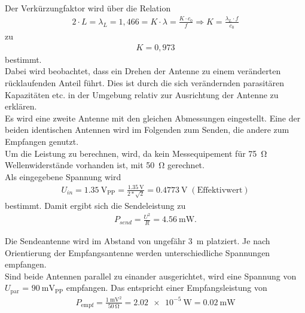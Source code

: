 \documentclass[a4paper,twoside,final]{article}
\begin{document}
Der Verkürzungfaktor wird über die Relation
\begin{align}
2\cdot L = \lambda_{L} = 1,466 = K \cdot \lambda = \frac{K\cdot c_0}{f} \Rightarrow K = \frac{\lambda_L \cdot f}{c_0}
\end{align}
zu
\begin{align}
K = 0,973
\end{align}
bestimmt.\\

Dabei wird beobachtet, dass ein Drehen der Antenne zu einem veränderten rücklaufenden Anteil führt. Dies ist durch die sich verändernden parasitären Kapazitäten etc. in der Umgebung relativ zur Ausrichtung der Antenne zu erklären.  \\
Es wird eine zweite Antenne mit den gleichen Abmessungen eingestellt. Eine der beiden identischen Antennen wird im Folgenden zum Senden, die andere zum Empfangen genutzt. \\
Um die Leistung zu berechnen, wird, da kein Messequipement für \SI{75}{\ohm} Wellenwiderstände vorhanden ist, mit \SI{50}{\ohm} gerechnet. \\
Als eingegebene Spannung wird
\begin{align}
U_{in} = \SI{1,35}{\volt_\text{PP}} = \frac{\SI{1,35}{\volt}}{2*\sqrt{2}} = \SI{0,4773}{\volt}\; (\text{Effektivwert})
\end{align}
bestimmt. Damit ergibt sich die Sendeleistung zu
\begin{align}
P_{send} = \frac{U^2}{R} =  \SI{4,56}{\milli\watt}.
\end{align}

Die Sendeantenne wird im Abstand von ungefähr \SI{3}{\meter} platziert. Je nach Orientierung der Empfangsantenne werden unterschiedliche Spannungen empfangen. \\
Sind beide Antennen parallel zu einander ausgerichtet, wird eine Spannung von $U_\text{par}$ = $\SI{90}{\milli\volt_\text{PP}}$ empfangen. Das entspricht einer Empfangsleistung von
\begin{align}
P_\text{empf} =   \frac{\SI{1}{\milli\volt\squared}}{\SI{50}{\ohm}} = \SI{2,02e-5}{\watt} = \SI{0,02}{\milli\watt}
\end{align}
\end{document}
